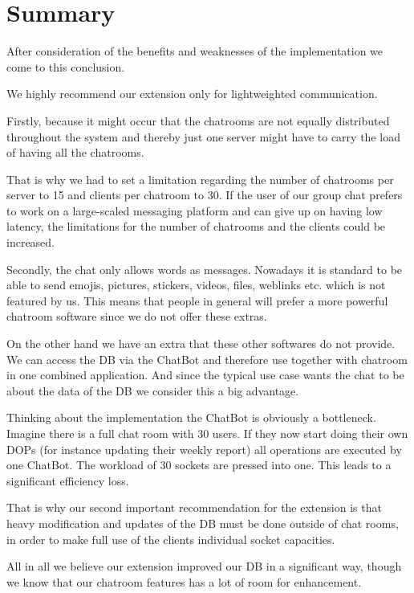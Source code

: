 \section{Summary}
\label{sec:summary}

After consideration of the benefits and weaknesses of the implementation we come to this conclusion.

We highly recommend our extension only for lightweighted communication. 

Firstly, because it might occur that the chatrooms are not equally distributed throughout the system and thereby just one server might have to carry the load of having all the chatrooms. 

That is why we had to set a limitation regarding the number of chatrooms per server to 15 and clients per chatroom to 30. If the user of our group chat prefers to work on a large-scaled messaging platform and can give up on having low latency, the limitations for the number of chatrooms and the clients could be increased.

Secondly, the chat only allows words as messages. Nowadays it is standard to be able to send emojis, pictures, stickers, videos, files, weblinks etc. which is not featured by us. This means that people in general will prefer a more powerful chatroom software since we do not offer these extras.

On the other hand we have an extra that these other softwares do not provide. We can access the DB via the ChatBot and therefore use together with chatroom in one combined application. And since the typical use case wants the chat to be about the data of the DB we consider this a big advantage.

Thinking about the implementation the ChatBot is obviously a bottleneck. Imagine there is a full chat room with 30 users. If they now start doing their own DOPs (for instance updating their weekly report) all operations are executed by one ChatBot. The workload of 30 sockets are pressed into one. This leads to a significant efficiency loss.

That is why our second important recommendation for the extension is that heavy modification and updates of the DB must be done outside of chat rooms, in order to make full use of the clients individual socket capacities.

All in all we believe our extension improved our DB in a significant way, though we know that our chatroom features has a lot of room for enhancement.



